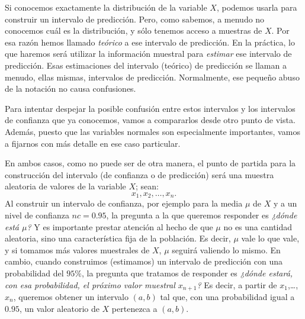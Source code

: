     \begin{center}
    \end{center}
Si conocemos exactamente la distribución de la variable $X$, podemos usarla para construir un intervalo de predicción. Pero, como sabemos, a menudo no conocemos cuál es la distribución, y sólo tenemos acceso a muestras de $X$. Por esa razón hemos llamado {\em teórico} a ese intervalo de predicción. En la práctica, lo que haremos será utilizar la información muestral para {\em estimar} ese intervalo de predicción. Esas estimaciones del intervalo (teórico) de predicción se llaman a menudo, ellas mismas, intervalos de predicción.  Normalmente, ese pequeño abuso de la notación no causa confusiones.

Para intentar despejar la posible confusión entre estos intervalos y los intervalos de confianza que ya conocemos, vamos a compararlos desde otro punto de vista. Además, puesto que las variables normales son especialmente importantes, vamos a fijarnos con más detalle en ese caso particular.

En ambos casos, como no puede ser de otra manera, el punto de partida para la construcción del intervalo (de confianza o de predicción) será una muestra aleatoria de valores de la variable $X$; sean:
\[x_1, x_2,\ldots, x_n.\]
Al construir un intervalo de confianza, por ejemplo para la media $\mu$ de $X$ y a un nivel de confianza $nc=0.95$, la pregunta a la que queremos responder es {\em ¿dónde está $\mu$?} Y es importante prestar atención al hecho de que $\mu$ no es una cantidad aleatoria, sino una característica fija de la población. Es decir, $\mu$ vale lo que vale, y si tomamos más valores muestrales de $X$, $\mu$ seguirá valiendo lo mismo. En cambio, cuando construimos (estimamos) un intervalo de predicción con una probabilidad del $95\%$, la pregunta que tratamos de responder es {\em ¿dónde estará, con esa probabilidad, el próximo valor muestral $x_{n+1}$?} Es decir, a partir de $x_1$,\ldots,$x_n$, queremos obtener un intervalo $(a,b)$ tal que, con una probabilidad igual a $0.95$, un valor aleatorio de $X$ pertenezca a $(a,b)$.


